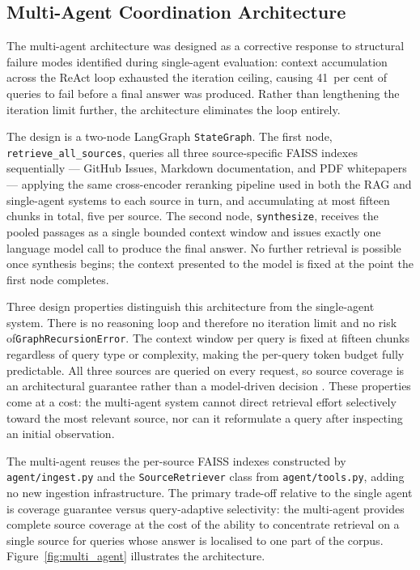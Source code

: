 \subsection{Multi-Agent Coordination Architecture}
\label{subsec:multi-agent-design}

The multi-agent architecture was designed as a corrective response to structural failure modes identified during single-agent evaluation: context accumulation across the ReAct loop exhausted the iteration ceiling, causing 41~per cent of queries to fail before a final answer was produced. Rather than lengthening the iteration limit further, the architecture eliminates the loop entirely.

\begin{sloppypar}
The design is a two-node LangGraph \texttt{StateGraph}. The first node, \texttt{retrieve\_all\_sources}, queries all three source-specific FAISS indexes sequentially — GitHub Issues, Markdown documentation, and PDF whitepapers — applying the same cross-encoder reranking pipeline used in both the RAG and single-agent systems to each source in turn, and accumulating at most fifteen chunks in total, five per source. The second node, \texttt{synthesize}, receives the pooled passages as a single bounded context window and issues exactly one language model call to produce the final answer. No further retrieval is possible once synthesis begins; the context presented to the model is fixed at the point the first node completes.
\end{sloppypar}

Three design properties distinguish this architecture from the single-agent system. There is no reasoning loop and therefore no iteration limit and no risk of\linebreak[0] \texttt{GraphRecursionError}. The context window per query is fixed at fifteen chunks regardless of query type or complexity, making the per-query token budget fully predictable. All three sources are queried on every request, so source coverage is an architectural guarantee rather than a model-driven decision \cite{xi2023rise}. These properties come at a cost: the multi-agent system cannot direct retrieval effort selectively toward the most relevant source, nor can it reformulate a query after inspecting an initial observation.

The multi-agent reuses the per-source FAISS indexes constructed by \texttt{agent/ingest.py} and the \texttt{SourceRetriever} class from \texttt{agent/tools.py}, adding no new ingestion infrastructure. The primary trade-off relative to the single agent is coverage guarantee versus query-adaptive selectivity: the multi-agent provides complete source coverage at the cost of the ability to concentrate retrieval on a single source for queries whose answer is localised to one part of the corpus. Figure~\ref{fig:multi_agent} illustrates the architecture.

